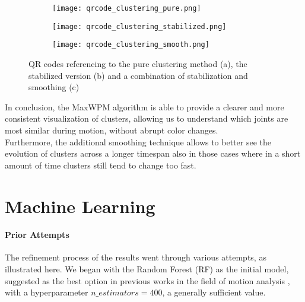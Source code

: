 \begin{figure}[H]
  \centering
  \begin{subfigure}[b]{0.49\textwidth}
    \centering
    \texttt{[image: qrcode\_clustering\_pure.png]}
    \caption{}
    \label{fig:qr_movement_pure}
  \end{subfigure}
  \hfill
  \begin{subfigure}[b]{0.49\textwidth}
    \centering
    \texttt{[image: qrcode\_clustering\_stabilized.png]}
    \caption{}
    \label{fig:qr_movement_stabilized}
  \end{subfigure}
  \hfill
  \begin{subfigure}[b]{0.49\textwidth}
    \centering
    \texttt{[image: qrcode\_clustering\_smooth.png]}
    \caption{}
    \label{fig:qr_movement_smooth}
  \end{subfigure}
  \caption{QR codes referencing to the pure clustering method (a), the stabilized version (b) and a combination of stabilization and smoothing (c)}
  \label{fig:qr_movements}
\end{figure}
\clearpage

In conclusion, the MaxWPM algorithm is able to provide a clearer and more consistent visualization of clusters, allowing us to understand which joints are most similar during motion, without abrupt color changes. \\
Furthermore, the additional smoothing technique allows to better see the evolution of clusters across a longer timespan also in those cases where in a short amount of time clusters still tend to change too fast.\\



\clearpage

\section{Machine Learning}

\paragraph{Prior Attempts}
The refinement process of the results went through various attempts, as illustrated here. 
We began with the Random Forest (RF) as the initial model, suggested as the best option in previous works in the field of motion analysis \cite{oneto:2020}, with a hyperparameter $n\_estimators = 400$, a generally sufficient value.

